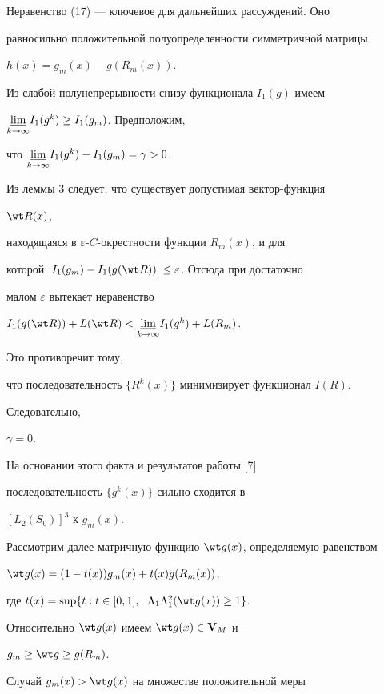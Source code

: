 \begin{pf}
\begin{equation}
\end{equation}


Неравенство (17) --- ключевое для дальнейших рассуждений. Оно


равносильно положительной полуопределенности симметричной матрицы


$h(x)=g_m(x)-g(R_m(x))$.





Из слабой полунепрерывности снизу функционала $I_1(g)$ имеем


$\underset{k\to\infty}{\varliminf}I_1(g^k)\ge I_1(g_m)$. Предположим,


что $\underset{k\to\infty}{\varliminf}I_1(g^k)-I_1(g_m)=\gamma>0$.


Из леммы 3 следует, что существует допустимая вектор-функция


$\wt R(x)$,


находящаяся в $\varepsilon$-$C$-окрестности функции $R_m(x)$, и для


которой $|I_1(g_m)-I_1(g(\wt R))|\le\varepsilon$. Отсюда при достаточно


малом $\varepsilon$ вытекает неравенство


$I_1(g(\wt R))+L(\wt R)<\underset{k\to\infty}{\varliminf}


I_1(g^k)+L(R_m)$.


Это противоречит тому,


что последовательность $\{R^k(x)\}$ минимизирует функционал $I(R)$.


Следовательно,


$\gamma=0$.


На основании этого факта и результатов работы [7]


последовательность $\{g^k(x)\}$ сильно сходится в


$[L_2(S_0)]^3$ к $g_m(x)$.





Рассмотрим далее матричную функцию $\wt g(x)$, определяемую равенством


$\wt g(x)=(1-t(x))g_m(x)+t(x)g(R_m(x))$,


где $t(x)=\sup\{t:t\in[0,1],\ \;\Lambda_1\Lambda^2_1(\wt g(x))\ge 1\}$.


Относительно $\wt g(x)$ имеем $\wt g(x)\in\bold V_M$ и


$g_m\ge\wt g\ge g(R_m)$.


Случай $g_m(x)>\wt g(x)$ на множестве положительной меры



\end{pf}

